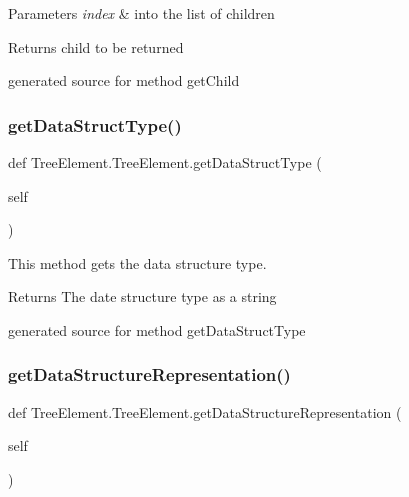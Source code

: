 \begin{DoxyParams}{Parameters}
{\em index} & into the list of children\\
\hline
\end{DoxyParams}
\begin{DoxyReturn}{Returns}
child to be returned\begin{DoxyVerb}generated source for method getChild \end{DoxyVerb}
 
\end{DoxyReturn}
\hypertarget{class_tree_element_1_1_tree_element_a8df62ace8d1ba7131fe348a87bfd1d28}{}\label{class_tree_element_1_1_tree_element_a8df62ace8d1ba7131fe348a87bfd1d28} 
\subsubsection{\texorpdfstring{get\+Data\+Struct\+Type()}{getDataStructType()}}
{\footnotesize\ttfamily def Tree\+Element.\+Tree\+Element.\+get\+Data\+Struct\+Type (\begin{DoxyParamCaption}\item[{}]{self }\end{DoxyParamCaption})}



This method gets the data structure type. 

\begin{DoxyReturn}{Returns}
The date structure type as a string\begin{DoxyVerb}generated source for method getDataStructType \end{DoxyVerb}
 
\end{DoxyReturn}
\hypertarget{class_tree_element_1_1_tree_element_a2353e72eb93c7f9d3670f3d790fbb78d}{}\label{class_tree_element_1_1_tree_element_a2353e72eb93c7f9d3670f3d790fbb78d} 
\subsubsection{\texorpdfstring{get\+Data\+Structure\+Representation()}{getDataStructureRepresentation()}}
{\footnotesize\ttfamily def Tree\+Element.\+Tree\+Element.\+get\+Data\+Structure\+Representation (\begin{DoxyParamCaption}\item[{}]{self }\end{DoxyParamCaption})}



